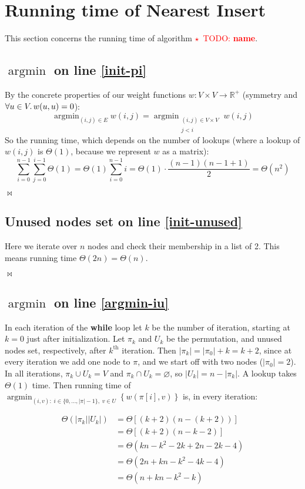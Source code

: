 \documentclass{article}
\newcommand{\todo}[1]{\textcolor{red}{$\star$~TODO: \textbf{#1}}}
\DeclareMathOperator*{\argmin}{argmin}
\newcommand{\qed}{\begin{flushright}$\bowtie$\end{flushright}}
\newcommand{\bb}[1]{\textbf{#1}}
\begin{document}
\section{Running time of Nearest Insert}
\label{appendix:runtime-ni}

This section concerns the running time of algorithm \todo{name}.

\subsection{$\argmin$ on line \ref*{init-pi}}

By the concrete properties of our weight functions $w:V\times V\to\mathbb{R}^{+}$
(symmetry and $\forall u\in V\ldotp w(u,u)=0$):
\[ \argmin_{(i,j)\in E} w(i,j) = \argmin_{\substack{(i,j)\in V\times V\\j<i}} w(i,j) \]
So the running time, which depends on the number of lookups (where a lookup of $w(i,j)$
is $\Theta(1)$, because we represent $w$ as a matrix):
\[ \sum_{i=0}^{n-1} \sum_{j=0}^{i-1} \Theta(1) = \Theta(1) \sum_{i=0}^{n-1} i
  = \Theta(1) \cdot \frac{(n-1)(n-1+1)}{2} = \Theta(n^2) \]
\qed

\subsection{Unused nodes set on line \ref*{init-unused}}

Here we iterate over $n$ nodes and check their membership in a list of 2. This means
running time $\Theta(2n) = \Theta(n)$. \qed

\subsection{$\argmin$ on line \ref*{argmin-iu}}

In each iteration of the \bb{while} loop let $k$ be the number of iteration,
starting at $k=0$ just after initialization. Let $\pi_k$ and $U_k$ be the permutation,
and unused nodes set, respectively, after $k^{\mathrm{th}}$ iteration.
Then $|\pi_k| = |\pi_0|+k = k+2$, since at every iteration we
add one node to $\pi$, and we start off with two nodes ($|\pi_0|=2$). In all iterations,
$\pi_k\cup U_k=V$ and $\pi_k\cap U_k=\varnothing$, so $|U_k|=n-|\pi_k|$. A lookup takes
$\Theta(1)$ time. Then running time of $\argmin_{(i,v):\;i\in\{0,...,|\pi|-1\},\;v\in U}
\left\{w\left(\pi[i], v\right)\right\}$ is, in every iteration:

\begin{align*}
  \Theta(|\pi_k||U_k|) & = \Theta\left[ (k+2)(n-(k+2)) \right] \\
                       & = \Theta\left[ (k+2)(n-k-2) \right] \\
                       & = \Theta(kn - k^2 - 2k + 2n - 2k - 4) \\
                       & = \Theta(2n + kn - k^2 - 4k - 4) \\
                       & = \Theta(n + kn - k^2 - k)
\end{align*}
\end{document}
